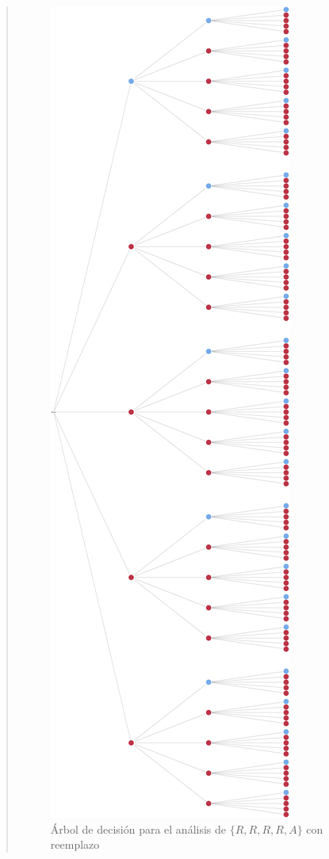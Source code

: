 \documentclass[
]{book}
\begin{document}
\begin{quote}
\begin{figure}
\centering
\includegraphics{./images/arbol_decision_1.jpeg}
\caption{Árbol de decisión para el análisis de \(\{ R, R, R, R, A\}\) con reemplazo}
\end{figure}


\end{quote}
\end{document}
